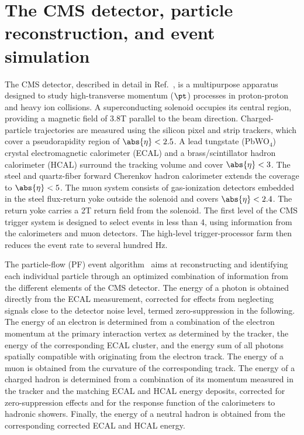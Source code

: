 \section{The CMS detector, particle reconstruction, and event simulation}
\label{sec:cms}

The CMS detector, described in detail in Ref.~\cite{CMSdetector}, is a multipurpose apparatus designed to study high-transverse momentum ($\pt$) processes in proton-proton and heavy ion collisions.  
%
A superconducting solenoid occupies its central region, providing a magnetic field of 3.8\unit{T} parallel to the beam direction. 
%
Charged-particle trajectories are measured using the silicon pixel and strip trackers, which cover a pseudorapidity region of $\abs{\eta} < 2.5$. 
%
A lead tungstate (PbWO$_4$) crystal electromagnetic calorimeter (ECAL) and a brass/scintillator hadron calorimeter (HCAL) surround the tracking volume and cover $\abs{\eta} < 3$. 
%
The steel and quartz-fiber forward Cherenkov hadron calorimeter extends the coverage to $\abs{\eta} < 5$.  
%
The muon system consists of gas-ionization detectors embedded in the steel flux-return yoke outside the solenoid and covers $\abs{\eta} < 2.4$. 
%
The return yoke carries a 2\unit{T} return field from the solenoid.
%
The first level of the CMS trigger system is designed to select events in less than 4\mus, using information from the calorimeters and muon detectors. 
%
The high-level trigger-processor farm then reduces the event rate to several hundred Hz.
%


The particle-flow (PF) event algorithm~\cite{Sirunyan:2017ulk} aims at reconstructing and identifying each individual particle through an optimized combination of information from the different elements of the CMS detector. 
%
The energy of a photon is obtained directly from the ECAL measurement, corrected for effects from neglecting signals close to the detector noise level, termed zero-suppression in the following. 
%
The energy of an electron is determined from a combination of the electron momentum at the primary interaction vertex as determined by the tracker, the energy of the corresponding ECAL cluster, and the energy sum of all photons spatially compatible with originating from the electron track.
% 
The energy of a muon is obtained from the curvature of the corresponding track. 
%
The energy of a charged hadron is determined from a combination of its momentum measured in the tracker and the matching ECAL and HCAL energy deposits, corrected for zero-suppression effects and for the response function of the calorimeters to hadronic showers. 
%
Finally, the energy of a neutral hadron is obtained from the corresponding corrected ECAL and HCAL energy.
%
